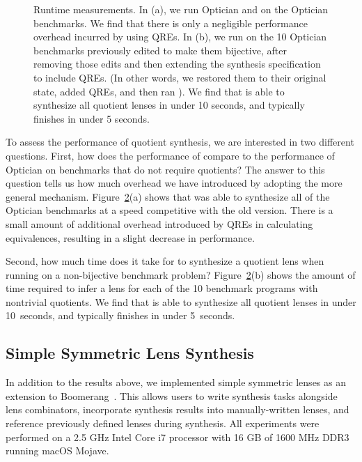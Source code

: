 \documentclass[12pt]{article}
\begin{document}
{\begin{figure}[t]
\begin{subfigure}[b]{.49\textwidth}
\caption{}
\label{subfig:examplesused}
\end{subfigure}
\caption{Runtime measurements. In (a), we run Optician and \QOpt{}
  on the Optician benchmarks.  We find that there is only a negligible
  performance overhead incurred by using QREs. 
  In (b), we run \QOpt{} on the 10 Optician benchmarks
  previously edited to make them bijective, after removing those edits
  and then extending the synthesis specification to include QREs.
  (In other words, we restored them to their original state, added QREs,
  and then ran \QOpt{}). 
  We find that \QOpt{} is able to
  synthesize all quotient lenses in under 10 seconds, and typically finishes in
  under 5 seconds.}
\label{fig:times}
\end{figure}

To assess the performance of quotient synthesis, we are interested in two different
questions. First, how does the performance of \QOpt{} compare to the performance
of Optician on benchmarks that do not require quotients? The answer to this question
tells us how much overhead we have introduced by adopting the more general
mechanism. Figure~\ref{fig:times}(a) shows that \QOpt{} was able to synthesize
all of the Optician benchmarks at a speed competitive with the old version.
There is a small amount of additional overhead introduced by QREs in calculating
equivalences, resulting in a slight decrease in performance.

Second, how much time does it take for \QOpt{} to synthesize a quotient
lens when running on a non-bijective benchmark problem?  
Figure~\ref{fig:times}(b) shows the amount of time required to infer a
lens for each of the 10 benchmark programs with nontrivial quotients.  
We find that \QOpt{} is able to synthesize all quotient lenses in
under 10~seconds, and typically finishes in under 5~seconds.

\subsection{Simple Symmetric Lens Synthesis}
In addition to the results above, we implemented simple symmetric lenses as an extension to
Boomerang~\cite{boomerang}.  
This allows users
to write synthesis tasks 
alongside lens combinators, incorporate synthesis results into manually-written
lenses, and reference previously defined lenses during synthesis. All experiments
were performed on a 2.5 GHz Intel Core i7 processor with 16 GB of 1600 MHz DDR3
running macOS Mojave.

}
\end{document}
